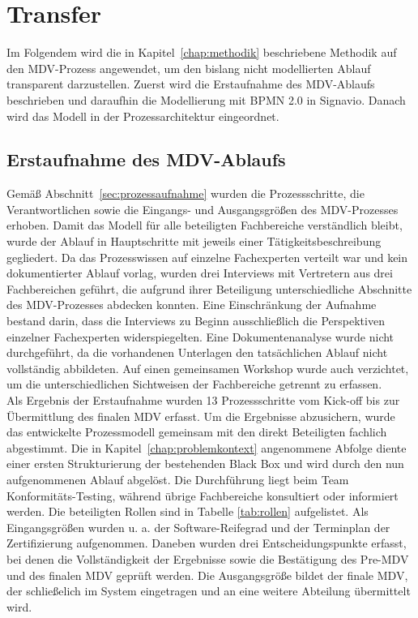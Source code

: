 \chapter{Transfer}
\label{chap:transfer}
Im Folgendem wird die in Kapitel~\ref{chap:methodik} beschriebene Methodik auf den MDV-Prozess angewendet, um den bislang nicht modellierten Ablauf transparent darzustellen. Zuerst wird die Erstaufnahme des MDV-Ablaufs beschrieben und daraufhin die Modellierung mit BPMN 2.0 in Signavio. Danach wird das  Modell in der Prozessarchitektur eingeordnet.

\section{Erstaufnahme des MDV-Ablaufs}
\label{sec:erstaufnahme}
Gemäß Abschnitt~\ref{sec:prozessaufnahme} wurden die Prozessschritte, die Verantwortlichen sowie die Eingangs- und Ausgangsgrößen des MDV-Prozesses erhoben. Damit das Modell für alle beteiligten Fachbereiche verständlich bleibt, wurde der Ablauf in Hauptschritte mit jeweils einer Tätigkeitsbeschreibung gegliedert. Da das Prozesswissen auf einzelne Fachexperten verteilt war und kein dokumentierter Ablauf vorlag, wurden drei Interviews mit Vertretern aus drei Fachbereichen geführt, die aufgrund ihrer Beteiligung unterschiedliche Abschnitte des MDV-Prozesses abdecken konnten. Eine Einschränkung der Aufnahme bestand darin, dass die Interviews zu Beginn ausschließlich die Perspektiven einzelner Fachexperten widerspiegelten. Eine Dokumentenanalyse wurde nicht durchgeführt, da die vorhandenen Unterlagen den tatsächlichen Ablauf nicht vollständig abbildeten. Auf einen gemeinsamen Workshop wurde auch verzichtet, um die unterschiedlichen Sichtweisen der Fachbereiche getrennt zu erfassen. 
\\
Als Ergebnis der Erstaufnahme wurden 13 Prozessschritte vom Kick-off bis zur Übermittlung des finalen MDV erfasst. Um die Ergebnisse abzusichern, wurde das  entwickelte Prozessmodell gemeinsam mit den direkt Beteiligten fachlich abgestimmt. Die in Kapitel~\ref{chap:problemkontext} angenommene Abfolge diente einer ersten Strukturierung der bestehenden Black Box und wird durch den nun aufgenommenen Ablauf abgelöst. Die Durchführung liegt beim Team Konformitäts-Testing, während übrige Fachbereiche konsultiert oder informiert werden. Die beteiligten Rollen sind in Tabelle \ref{tab:rollen} aufgelistet. Als Eingangsgrößen wurden u. a. der Software-Reifegrad und der Terminplan der Zertifizierung aufgenommen. Daneben wurden drei Entscheidungspunkte erfasst, bei denen die Vollständigkeit der Ergebnisse sowie die Bestätigung des Pre-MDV und des finalen MDV geprüft werden. Die Ausgangsgröße bildet der finale MDV, der schließelich im System eingetragen und an eine weitere Abteilung übermittelt wird. 

